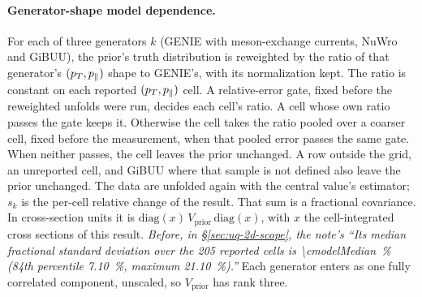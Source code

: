 
\paragraph{Generator-shape model dependence.} For each of three generators $k$ (GENIE with meson-exchange currents, NuWro and GiBUU), the prior's truth distribution is reweighted by the ratio of that generator's $(p_{T},p_{\parallel})$ shape to GENIE's, with its normalization kept. The ratio is constant on each reported $(p_{T},p_{\parallel})$ cell. A relative-error gate, fixed before the reweighted unfolds were run, decides each cell's ratio. A cell whose own ratio passes the gate keeps it. Otherwise the cell takes the ratio pooled over a coarser cell, fixed before the measurement, when that pooled error passes the same gate. When neither passes, the cell leaves the prior unchanged. A row outside the grid, an unreported cell, and GiBUU where that sample is not defined also leave the prior unchanged. The data are unfolded again with the central value's estimator; $s_k$ is the per-cell relative change of the result. That sum is a fractional covariance. In cross-section units it is $\mathrm{diag}(x)\,V_{\mathrm{prior}}\,\mathrm{diag}(x)$, with $x$ the cell-integrated cross sections of this result. \emph{Before, in \S\ref{sec:uq-2d-scope}, the note's ``Its median fractional standard deviation over the 205 reported cells is \SI{\cmodelMedian}{\percent} (84th percentile \SI{7.10}{\percent}, maximum \SI{21.10}{\percent}).''} Each generator enters as one fully correlated component, unscaled, so $V_{\mathrm{prior}}$ has rank three.

